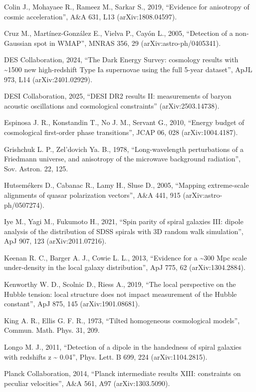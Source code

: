 \documentclass[
]{article}
\begin{document}
Colin J., Mohayaee R., Rameez M., Sarkar S., 2019, ``Evidence for
anisotropy of cosmic acceleration'', A\&A 631, L13 (arXiv:1808.04597).

Cruz M., Martínez-González E., Vielva P., Cayón L., 2005, ``Detection of
a non-Gaussian spot in WMAP'', MNRAS 356, 29 (arXiv:astro-ph/0405341).

DES Collaboration, 2024, ``The Dark Energy Survey: cosmology results
with \textasciitilde1500 new high-redshift Type Ia supernovae using the
full 5-year dataset'', ApJL 973, L14 (arXiv:2401.02929).

DESI Collaboration, 2025, ``DESI DR2 results II: measurements of baryon
acoustic oscillations and cosmological constraints'' (arXiv:2503.14738).

Espinosa J. R., Konstandin T., No J. M., Servant G., 2010, ``Energy
budget of cosmological first-order phase transitions'', JCAP 06, 028
(arXiv:1004.4187).

Grishchuk L. P., Zel'dovich Ya. B., 1978, ``Long-wavelength
perturbations of a Friedmann universe, and anisotropy of the microwave
background radiation'', Sov. Astron. 22, 125.

Hutsemékers D., Cabanac R., Lamy H., Sluse D., 2005, ``Mapping
extreme-scale alignments of quasar polarization vectors'', A\&A 441, 915
(arXiv:astro-ph/0507274).

Iye M., Yagi M., Fukumoto H., 2021, ``Spin parity of spiral galaxies
III: dipole analysis of the distribution of SDSS spirals with 3D random
walk simulation'', ApJ 907, 123 (arXiv:2011.07216).

Keenan R. C., Barger A. J., Cowie L. L., 2013, ``Evidence for a
\textasciitilde300 Mpc scale under-density in the local galaxy
distribution'', ApJ 775, 62 (arXiv:1304.2884).

Kenworthy W. D., Scolnic D., Riess A., 2019, ``The local perspective on
the Hubble tension: local structure does not impact measurement of the
Hubble constant'', ApJ 875, 145 (arXiv:1901.08681).

King A. R., Ellis G. F. R., 1973, ``Tilted homogeneous cosmological
models'', Commun. Math. Phys. 31, 209.

Longo M. J., 2011, ``Detection of a dipole in the handedness of spiral
galaxies with redshifts z \textasciitilde{} 0.04'', Phys. Lett. B 699,
224 (arXiv:1104.2815).

Planck Collaboration, 2014, ``Planck intermediate results XIII:
constraints on peculiar velocities'', A\&A 561, A97 (arXiv:1303.5090).
\end{document}
